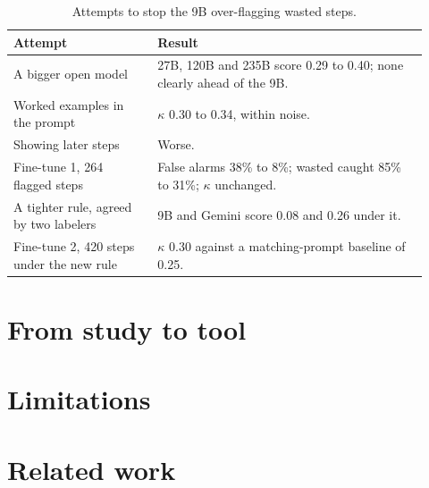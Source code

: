 \documentclass[11pt]{article}
\begin{document}
\begin{table}[t]
\centering\small
\begin{tabular}{@{}p{0.32\linewidth}p{0.6\linewidth}@{}}
\toprule
Attempt & Result \\
\midrule
A bigger open model & 27B, 120B and 235B score 0.29 to 0.40; none clearly ahead of the 9B. \\
Worked examples in the prompt & $\kappa$ 0.30 to 0.34, within noise. \\
Showing later steps & Worse. \\
Fine-tune 1, 264 flagged steps & False alarms 38\% to 8\%; wasted caught 85\% to 31\%; $\kappa$ unchanged. \\
A tighter rule, agreed by two labelers & 9B and Gemini score 0.08 and 0.26 under it. \\
Fine-tune 2, 420 steps under the new rule & $\kappa$ 0.30 against a matching-prompt baseline of 0.25. \\
\bottomrule
\end{tabular}
\caption{Attempts to stop the 9B over-flagging wasted steps.}
\label{tab:failed}
\end{table}


\section{From study to tool}

\section{Limitations}

\section{Related work}
\end{document}
